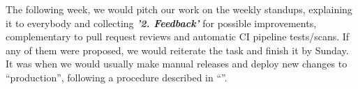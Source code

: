 The following week, we would pitch our work on the weekly standups, explaining it to everybody and collecting \textbf{\textit{'2. Feedback'}} for possible improvements, complementary to pull request reviews and automatic CI pipeline tests/scans. If any of them were proposed, we would reiterate the task and finish it by Sunday. It was when we would usually make manual releases and deploy new changes to “production”, following a procedure described in “”.
